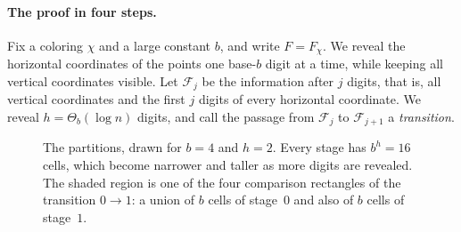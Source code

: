 \documentclass[11pt,letterpaper]{article}
\newcommand{\F}{\mathcal{F}}
\newcommand{\1}{\mathbf{1}}
\begin{document}
\paragraph{The proof in four steps.}
Fix a coloring $\chi$ and a large constant $b$, and write $F=F_\chi$. We reveal the horizontal coordinates of the points one base-$b$ digit at a time, while keeping all vertical coordinates visible. Let $\F_j$ be the information after $j$ digits, that is, all vertical coordinates and the first $j$ digits of every horizontal coordinate. We reveal $h=\Theta_b(\log n)$ digits, and call the passage from $\F_j$ to $\F_{j+1}$ a \emph{transition}.
\begin{figure}[!t]
\centering
{}
\caption{The partitions, drawn for $b=4$ and $h=2$. Every stage has $b^h=16$ cells, which become narrower and taller as more digits are revealed. The shaded region is one of the four comparison rectangles of the transition $0\to1$: a union of $b$ cells of stage~$0$ and also of $b$ cells of stage~$1$.}
\label{fig:stages}
\end{figure}
\end{document}
